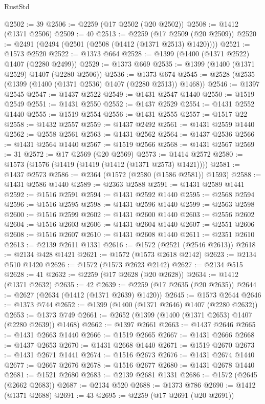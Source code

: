 \begin{lexlean}{RustStd}
\begin{coremodule}
@2502 := 39
@2506 := @2259 (@17 @2502 (@20 @2502))
@2508 := @1412 (@1371 @2506)
@2509 := 40
@2513 := @2259 (@17 @2509 (@20 @2509))
@2520 := @2491 (@2494 (@2501 (@2508 (@1412 (@1371 @2513) @1420))))
@2521 := @1573 @2520
@2522 := @1373 @664
@2528 := @1399 (@1400 (@1371 @2522) @1407 (@2280 @2499))
@2529 := @1373 @669
@2535 := @1399 (@1400 (@1371 @2529) @1407 (@2280 @2506))
@2536 := @1373 @674
@2545 := @2528 (@2535 (@1399 (@1400 (@1371 @2536) @1407 (@2280 @2513)) @1468))
@2546 := @1397 @2545
@2547 := @1437 @2522
@2549 := @1431 @2547 @1440
@2550 := @1519 @2549
@2551 := @1431 @2550
@2552 := @1437 @2529
@2554 := @1431 @2552 @1440
@2555 := @1519 @2554
@2556 := @1431 @2555
@2557 := @1517 @22
@2558 := @1432 @2557
@2559 := @1437 @2492
@2561 := @1431 @2559 @1440
@2562 := @2558 @2561
@2563 := @1431 @2562
@2564 := @1437 @2536
@2566 := @1431 @2564 @1440
@2567 := @1519 @2566
@2568 := @1431 @2567
@2569 := 31
@2572 := @17 @2569 (@20 @2569)
@2573 := @1414 @2572
@2580 := @1573 (@1576 (@1419 (@1419 (@1412 (@1371 @2573) @1421))))
@2581 := @1437 @2573
@2586 := @2364 (@1572 (@2580 (@1586 @2581)) @1593)
@2588 := @1431 @2586 @1440
@2589 := @2363 @2588
@2591 := @1431 @2589 @1441
@2592 := @1516 @2591
@2594 := @1431 @2592 @1440
@2595 := @2568 @2594
@2596 := @1516 @2595
@2598 := @1431 @2596 @1440
@2599 := @2563 @2598
@2600 := @1516 @2599
@2602 := @1431 @2600 @1440
@2603 := @2556 @2602
@2604 := @1516 @2603
@2606 := @1431 @2604 @1440
@2607 := @2551 @2606
@2608 := @1516 @2607
@2610 := @1431 @2608 @1440
@2611 := @2351 @2610
@2613 := @2139 @2611 @1331
@2616 := @1572 (@2521 (@2546 @2613))
@2618 := @2134 @428 @1421
@2621 := @1572 (@1573 @2618 @2142)
@2623 := @2134 @510 @1420
@2626 := @1572 (@1573 @2623 @2142)
@2627 := @2134 @515
@2628 := 41
@2632 := @2259 (@17 @2628 (@20 @2628))
@2634 := @1412 (@1371 @2632)
@2635 := 42
@2639 := @2259 (@17 @2635 (@20 @2635))
@2644 := @2627 (@2634 (@1412 (@1371 @2639) @1420))
@2645 := @1573 @2644
@2646 := @1373 @744
@2652 := @1399 (@1400 (@1371 @2646) @1407 (@2280 @2632))
@2653 := @1373 @749
@2661 := @2652 (@1399 (@1400 (@1371 @2653) @1407 (@2280 @2639)) @1468)
@2662 := @1397 @2661
@2663 := @1437 @2646
@2665 := @1431 @2663 @1440
@2666 := @1519 @2665
@2667 := @1431 @2666
@2668 := @1437 @2653
@2670 := @1431 @2668 @1440
@2671 := @1519 @2670
@2673 := @1431 @2671 @1441
@2674 := @1516 @2673
@2676 := @1431 @2674 @1440
@2677 := @2667 @2676
@2678 := @1516 @2677
@2680 := @1431 @2678 @1440
@2681 := @1521 @2680
@2683 := @2139 @2681 @1331
@2686 := @1572 (@2645 (@2662 @2683))
@2687 := @2134 @520
@2688 := @1373 @786
@2690 := @1412 (@1371 @2688)
@2691 := 43
@2695 := @2259 (@17 @2691 (@20 @2691))

\end{coremodule}
\end{lexlean}
